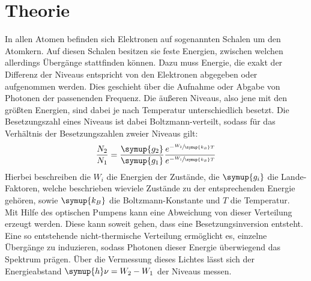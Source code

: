 \section{Theorie}
\label{sec:theorie}

In allen Atomen befinden sich Elektronen auf sogenannten Schalen um den
Atomkern. Auf diesen Schalen besitzen sie feste Energien, zwischen welchen
allerdings Übergänge stattfinden können. Dazu muss Energie, die exakt der
Differenz der Niveaus entspricht von den Elektronen abgegeben oder aufgenommen
werden. Dies geschieht über die Aufnahme oder Abgabe von Photonen der
passenenden Frequenz. Die äußeren Niveaus, also jene mit den größten Energien,
sind dabei je nach Temperatur unterschiedlich besetzt. Die Besetzungszahl eines
Niveaus ist dabei Boltzmann-verteilt, sodass für das Verhältnis der
Besetzungszahlen zweier Niveaus gilt:
%
\begin{equation}
  \frac{N_2}{N_1}=\frac{\symup{g_2}}{\symup{g_1}}\frac{e^{-\sfrac{W_2}{\symup{k_B}T}}}{e^{-\sfrac{W_1}{\symup{k_B}T}}}
\end{equation}
%
Hierbei beschreiben die $W_i$ die Energien der Zustände, die $\symup{g_i}$ die
Lande-Faktoren, welche beschrieben wieviele Zustände zu der entsprechenden
Energie gehören, sowie $\symup{k_B}$ die Boltzmann-Konstante und $T$ die
Temperatur. \\
Mit Hilfe des optischen Pumpens kann eine Abweichung von dieser Verteilung
erzeugt werden. Diese kann soweit gehen, dass eine Besetzungsinversion
entsteht. Eine so entstehende nicht-thermische Verteilung ermöglicht es,
einzelne Übergänge zu induzieren, sodass Photonen dieser Energie überwiegend
das Spektrum prägen. Über die Vermessung dieses Lichtes lässt sich der
Energieabstand $\symup{h}\nu=W_2-W_1$ der Niveaus messen.


